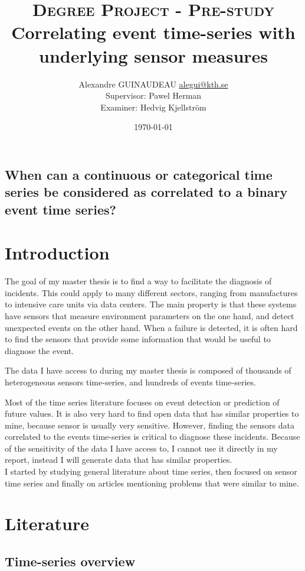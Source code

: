 \documentclass[12pt,a4paper]{article}
\title{\textsc{Degree Project - Pre-study} \\ Correlating event time-series with underlying sensor measures}
\author{Alexandre GUINAUDEAU \href{mailto:alegui@kth.se}{alegui@kth.se}\\
Supervisor: Pawel Herman\\
Examiner: Hedvig Kjellstr{\"o}m}
\date{\today}
\begin{document}
\maketitle

\newpage

\subsection*{When can a continuous or categorical time series be considered as correlated to a binary event time series?}

\section*{Introduction}

The goal of my master thesis is to find a way to facilitate the diagnosis of incidents. This could apply to many different sectors, ranging from manufactures to intensive care units via data centers.
The main property is that these systems have sensors that measure environment parameters on the one hand, and detect unexpected events on the other hand. When a failure is detected, it is often hard to find the sensors that provide some information that would be useful to diagnose the event.

The data I have access to during my master thesis is composed of thousands of heterogeneous sensors time-series, and hundreds of events time-series.

Most of the time series literature focuses on event detection or prediction of future values.
It is also very hard to find open data that has similar properties to mine, because sensor is usually very sensitive.
However, finding the sensors data correlated to the events time-series is critical to diagnose these incidents.
Because of the sensitivity of the data I have access to, I cannot use it directly in my report, instead I will generate data that has similar properties.\\

I started by studying general literature about time series, then focused on sensor time series and finally on articles mentioning problems that were similar to mine.

\section*{Literature}

\subsection*{Time-series overview}
\end{document}

